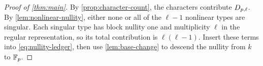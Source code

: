 \begin{proof}[Proof of \cref{thm:main}]
By \cref{prop:character-count}, the characters contribute $D_{p,\ell}$.  By
\cref{lem:nonlinear-nullity}, either none or all of the $\ell-1$ nonlinear
types are singular.  Each singular type has block nullity one and multiplicity
$\ell$ in the regular representation, so its total contribution is
$\ell(\ell-1)$.  Insert these terms into \eqref{eq:nullity-ledger}, then use
\cref{lem:base-change} to descend the nullity from $k$ to $\mathbb F_p$.
\end{proof}
